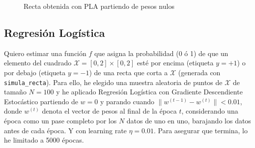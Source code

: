 \documentclass[a4]{article}
\begin{document}
\begin{figure}[H]
    \centering
    \caption{Recta obtenida con PLA partiendo de pesos nulos}
    \label{fig:lin-regress}
\end{figure}

\newpage 

\subsection{Regresión Logística}

Quiero estimar una función $f$ que asigna la probabilidad (0 ó 1) de que
un elemento del cuadrado $\mathcal{X}=[0,2]\times[0,2]$ esté por
encima (etiqueta $y=+1$) o por debajo (etiqueta $y=-1$) de una
recta que corta a $\mathcal{X}$ (generada con \texttt{simula\_recta}). Para ello, he elegido una muestra
aleatoria de puntos de $\mathcal{X}$ de tamaño $N=100$ y he aplicado
Regresión Logística con Gradiente Descendiente Estocástico partiendo
de $w=0$ y parando cuando $\|w^{(t-1)}-w^{(t)}\|<0.01$, donde $w^{(t)}$
denota el vector de pesos al final de la época $t$,
considerando una época como un pase completo por los $N$ datos de uno en
uno, barajando los datos antes de cada época. Y con learning rate $\eta = 0.01$.
Para asegurar que termina, lo he limitado a 5000 épocas.
\end{document}
